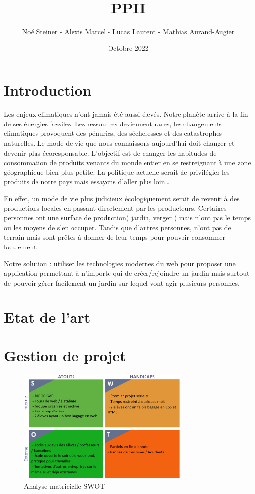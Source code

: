 \documentclass[french,a4paper]{article}
\title{PPII}
\author{Noé Steiner - Alexis Marcel - Lucas Laurent - Mathias Aurand-Augier}
\date{Octobre 2022}
\begin{document}
\maketitle
\newpage
\tableofcontents
\newpage
\section{Introduction}

Les enjeux climatiques n’ont jamais été aussi élevés. Notre planète arrive à la
fin de ses énergies fossiles. Les ressources deviennent rares, les changements
climatiques provoquent des pénuries, des sécheresses et des catastrophes
naturelles. Le mode de vie que nous connaissons aujourd’hui doit changer et
devenir plus écoresponsable. L’objectif est de changer les habitudes de
consommation de produits venants du monde entier en se restreignant à une zone
géographique bien plus petite. La politique actuelle serait de privilégier les
produits de notre pays mais essayons d’aller plus loin…

En effet, un mode de vie plus judicieux écologiquement serait de revenir à des
productions locales en passant directement par les producteurs. Certaines
personnes ont une surface de production( jardin, verger ) mais n’ont pas le
temps ou les moyens de s’en occuper. Tandis que d’autres personnes, n’ont pas
de terrain mais sont prêtes à donner de leur temps pour pouvoir consommer
localement.

Notre solution : utiliser les technologies modernes du web pour proposer une
application permettant à n’importe qui de créer/rejoindre un jardin mais
surtout de pouvoir gérer facilement un jardin sur lequel vont agir plusieurs
personnes.

\newpage
\section{Etat de l'art}

\newpage
\section{Gestion de projet}

\begin{figure}[h]
    \centering
    \includegraphics[width=0.75\textwidth]{img/SWOT.png}
    \caption{Analyse matricielle SWOT}
    \label{fig:mesh1}
\end{figure}
\end{document}
